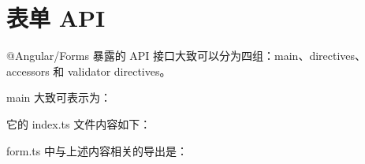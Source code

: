 \section{表单 API}


@Angular/Forms 暴露的 API 接口大致可以分为四组：main、directives、accessors 和 validator directives。


main 大致可表示为：




它的 index.ts 文件内容如下：




form.ts 中与上述内容相关的导出是：




